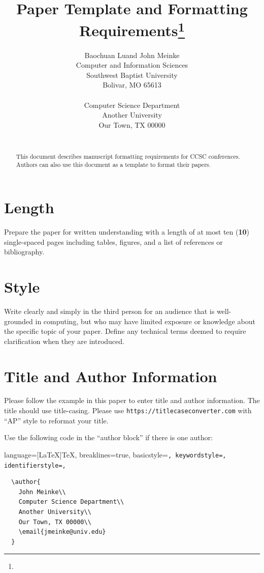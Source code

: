 \documentclass[article,twoside]{combine}
\title{Paper Template and Formatting Requirements\footnote{\protect}
}
\author{
Baochuan Lu\affmark[1] and John Meinke\affmark[2]\\
\affmark[1]Computer and Information Sciences\\
Southwest Baptist University\\
Bolivar, MO 65613\\
\email{blu@sbuniv.edu}\\
\affmark[2]Computer Science Department\\
Another University\\
Our Town, TX 00000\\
\email{jmeinke@univ.edu}\\
}
\begin{document}
\maketitle

\begin{abstract}
This document describes manuscript formatting requirements for CCSC conferences.
Authors can also use this document as a template to format their papers.
\end{abstract}

\section{Length}
Prepare the paper for written understanding with a length of at most ten
(\textbf{10}) single-spaced pages including tables, figures, and a list of references or
bibliography.

\section{Style}
Write clearly and simply in the third person for an audience that is
well-grounded in computing, but who may have limited exposure or knowledge about
the specific topic of your paper. Define any technical terms deemed to require
clarification when they are introduced.

\section{Title and Author Information}
Please follow the example in this paper to enter title and author information.
The title should use title-casing. Please use \texttt{https://titlecaseconverter.com}
with ``AP'' style to reformat your title.

Use the following code in the ``author block'' if there is one author:

\lstset
{
    language=[LaTeX]TeX,
    breaklines=true,
    basicstyle=\tt\scriptsize,
    keywordstyle=\color{blue},
    identifierstyle=\color{magenta},
}

\begin{lstlisting}
  \author{
    John Meinke\\
    Computer Science Department\\
    Another University\\
    Our Town, TX 00000\\
    \email{jmeinke@univ.edu}
  }
\end{lstlisting}
\end{document}
